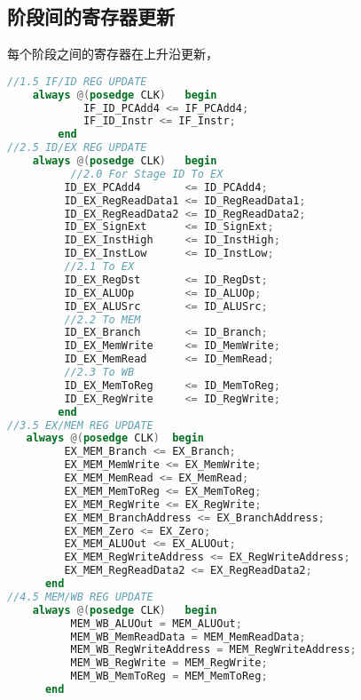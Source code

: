 \documentclass[a4paper]{article}
\begin{document}
    \subsection{阶段间的寄存器更新}
        每个阶段之间的寄存器在上升沿更新，
        \begin{lstlisting}[language={Verilog},title={internalRegUpdate.v}]
//1.5 IF/ID REG UPDATE
	always @(posedge CLK)	begin
			IF_ID_PCAdd4 <= IF_PCAdd4;
			IF_ID_Instr <= IF_Instr;
		end
//2.5 ID/EX REG UPDATE
	always @(posedge CLK)	begin
		  //2.0 For Stage ID To EX
	     ID_EX_PCAdd4       <= ID_PCAdd4;
	     ID_EX_RegReadData1 <= ID_RegReadData1;
	     ID_EX_RegReadData2 <= ID_RegReadData2;
	     ID_EX_SignExt      <= ID_SignExt;
	     ID_EX_InstHigh     <= ID_InstHigh;
	     ID_EX_InstLow      <= ID_InstLow;
	     //2.1 To EX
	     ID_EX_RegDst       <= ID_RegDst;
	     ID_EX_ALUOp        <= ID_ALUOp;
	     ID_EX_ALUSrc       <= ID_ALUSrc;
	     //2.2 To MEM
	     ID_EX_Branch       <= ID_Branch;
	     ID_EX_MemWrite     <= ID_MemWrite;
	     ID_EX_MemRead      <= ID_MemRead;
	     //2.3 To WB
	     ID_EX_MemToReg     <= ID_MemToReg;
	     ID_EX_RegWrite     <= ID_RegWrite;
		end
//3.5 EX/MEM REG UPDATE
   always @(posedge CLK)  begin
		 EX_MEM_Branch <= EX_Branch;
		 EX_MEM_MemWrite <= EX_MemWrite;
		 EX_MEM_MemRead <= EX_MemRead;
		 EX_MEM_MemToReg <= EX_MemToReg;
		 EX_MEM_RegWrite <= EX_RegWrite;
		 EX_MEM_BranchAddress <= EX_BranchAddress;
		 EX_MEM_Zero <= EX_Zero;
		 EX_MEM_ALUOut <= EX_ALUOut;
		 EX_MEM_RegWriteAddress <= EX_RegWriteAddress;
		 EX_MEM_RegReadData2 <= EX_RegReadData2;
	  end	
//4.5 MEM/WB REG UPDATE
	always @(posedge CLK)	begin
	      MEM_WB_ALUOut = MEM_ALUOut;
	      MEM_WB_MemReadData = MEM_MemReadData;
	      MEM_WB_RegWriteAddress = MEM_RegWriteAddress;
	      MEM_WB_RegWrite = MEM_RegWrite;
	      MEM_WB_MemToReg = MEM_MemToReg;
      end   \end{lstlisting}
\end{document}
